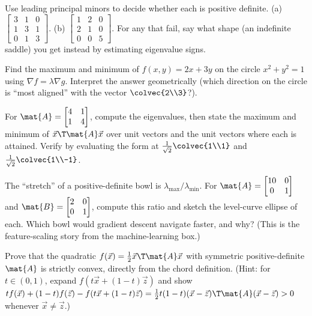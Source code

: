 \begin{exercise}
\label{ch36:exr-sylvester}
Use leading principal minors to decide whether each is positive definite.
(a) $\begin{bmatrix}3&1&0\\1&3&1\\0&1&3\end{bmatrix}$.
(b) $\begin{bmatrix}1&2&0\\2&1&0\\0&0&5\end{bmatrix}$.
For any that fail, say what shape (an indefinite saddle) you get instead by
estimating eigenvalue signs.
\end{exercise}

\begin{exercise}
\label{ch36:exr-lagrange}
Find the maximum and minimum of $f(x,y)=2x+3y$ on the circle $x^2+y^2=1$ using
$\nabla f=\lambda\nabla g$. Interpret the answer geometrically (which direction on the
circle is ``most aligned'' with the vector $\colvec{2\\3}$?).
\end{exercise}

\begin{exercise}
\label{ch36:exr-rayleigh}
For $\mat{A}=\begin{bmatrix}4&1\\1&4\end{bmatrix}$, compute the eigenvalues, then
state the maximum and minimum of $\vec{x}\T\mat{A}\vec{x}$ over unit vectors and the
unit vectors where each is attained. Verify by evaluating the form at
$\tfrac{1}{\sqrt2}\colvec{1\\1}$ and $\tfrac{1}{\sqrt2}\colvec{1\\-1}$.
\end{exercise}

\begin{exercise}
\label{ch36:exr-condition}
The ``stretch'' of a positive-definite bowl is $\lambda_{\max}/\lambda_{\min}$. For
$\mat{A}=\begin{bmatrix}10&0\\0&1\end{bmatrix}$ and
$\mat{B}=\begin{bmatrix}2&0\\0&1\end{bmatrix}$, compute this ratio and sketch the
level-curve ellipse of each. Which bowl would gradient descent navigate faster, and
why? (This is the feature-scaling story from the machine-learning box.)
\end{exercise}

\begin{exercise}
\label{ch36:exr-proof}
Prove that the quadratic $f(\vec{x})=\tfrac12\vec{x}\T\mat{A}\vec{x}$ with symmetric
positive-definite $\mat{A}$ is strictly convex, directly from the chord definition.
(Hint: for $t\in(0,1)$, expand $f(t\vec{x}+(1-t)\vec{z})$ and show
$t f(\vec{x})+(1-t)f(\vec{z}) - f(t\vec{x}+(1-t)\vec{z}) = \tfrac12 t(1-t)(\vec{x}-
\vec{z})\T\mat{A}(\vec{x}-\vec{z}) > 0$ whenever $\vec{x}\ne\vec{z}$.)
\end{exercise}
